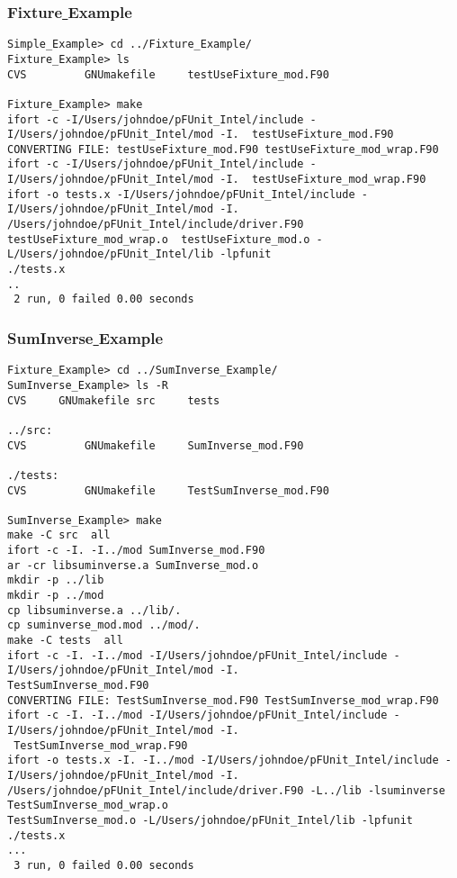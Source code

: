 \documentclass[10pt]{article}
\begin{document}
\subsubsection{Fixture\underline{ }Example}

{\small \begin{verbatim}
Simple_Example> cd ../Fixture_Example/
Fixture_Example> ls
CVS			GNUmakefile		testUseFixture_mod.F90

Fixture_Example> make
ifort -c -I/Users/johndoe/pFUnit_Intel/include -I/Users/johndoe/pFUnit_Intel/mod -I.  testUseFixture_mod.F90
CONVERTING FILE: testUseFixture_mod.F90 testUseFixture_mod_wrap.F90
ifort -c -I/Users/johndoe/pFUnit_Intel/include -I/Users/johndoe/pFUnit_Intel/mod -I.  testUseFixture_mod_wrap.F90
ifort -o tests.x -I/Users/johndoe/pFUnit_Intel/include -I/Users/johndoe/pFUnit_Intel/mod -I. /Users/johndoe/pFUnit_Intel/include/driver.F90  testUseFixture_mod_wrap.o  testUseFixture_mod.o -L/Users/johndoe/pFUnit_Intel/lib -lpfunit 
./tests.x     
..
 2 run, 0 failed 0.00 seconds
\end{verbatim}
}

\subsubsection{SumInverse\underline{ }Example}

{\small \begin{verbatim}
Fixture_Example> cd ../SumInverse_Example/
SumInverse_Example> ls -R
CVS		GNUmakefile	src		tests

../src:
CVS			GNUmakefile		SumInverse_mod.F90

./tests:
CVS			GNUmakefile		TestSumInverse_mod.F90

SumInverse_Example> make
make -C src  all
ifort -c -I. -I../mod SumInverse_mod.F90 
ar -cr libsuminverse.a SumInverse_mod.o
mkdir -p ../lib
mkdir -p ../mod
cp libsuminverse.a ../lib/.
cp suminverse_mod.mod ../mod/.
make -C tests  all
ifort -c -I. -I../mod -I/Users/johndoe/pFUnit_Intel/include -I/Users/johndoe/pFUnit_Intel/mod -I. 
TestSumInverse_mod.F90
CONVERTING FILE: TestSumInverse_mod.F90 TestSumInverse_mod_wrap.F90
ifort -c -I. -I../mod -I/Users/johndoe/pFUnit_Intel/include -I/Users/johndoe/pFUnit_Intel/mod -I.
 TestSumInverse_mod_wrap.F90
ifort -o tests.x -I. -I../mod -I/Users/johndoe/pFUnit_Intel/include -I/Users/johndoe/pFUnit_Intel/mod -I. 
/Users/johndoe/pFUnit_Intel/include/driver.F90 -L../lib -lsuminverse  TestSumInverse_mod_wrap.o  
TestSumInverse_mod.o -L/Users/johndoe/pFUnit_Intel/lib -lpfunit 
./tests.x     
...
 3 run, 0 failed 0.00 seconds

\end{verbatim}
}
\end{document}
